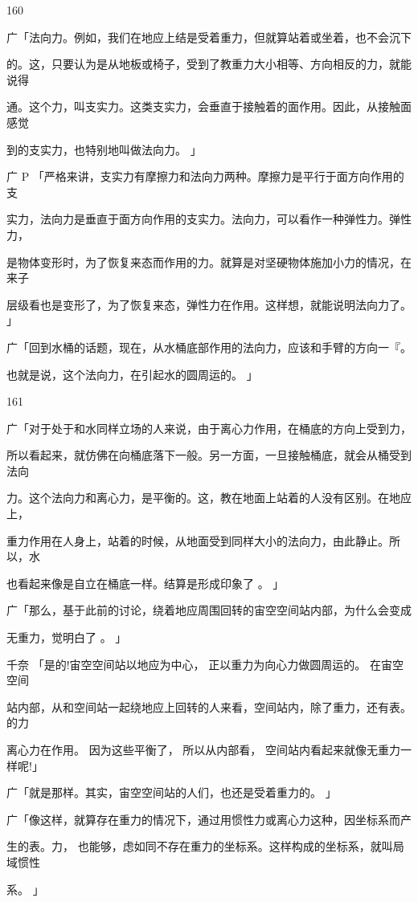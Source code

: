 160\par
广「法向力。例如，我们在地应上结是受着重力，但就算站着或坐着，也不会沉下\par
的。这，只要认为是从地板或椅子，受到了教重力大小相等、方向相反的力，就能说得\par
通。这个力，叫支实力。这类支实力，会垂直于接触着的面作用。因此，从接触面感觉\par
到的支实力，也特别地叫做法向力。 」\par
广 P 「严格来讲，支实力有摩擦力和法向力两种。摩擦力是平行于面方向作用的支\par
实力，法向力是垂直于面方向作用的支实力。法向力，可以看作一种弹性力。弹性力，\par
是物体变形时，为了恢复来态而作用的力。就算是对坚硬物体施加小力的情况，在来子\par
层级看也是变形了，为了恢复来态，弹性力在作用。这样想，就能说明法向力了。 」\par
广「回到水桶的话题，现在，从水桶底部作用的法向力，应该和手臂的方向一『。\par
也就是说，这个法向力，在引起水的圆周运的。 」\par

161\par
广「对于处于和水同样立场的人来说，由于离心力作用，在桶底的方向上受到力，\par
所以看起来，就仿佛在向桶底落下一般。另一方面，一旦接触桶底，就会从桶受到法向\par
力。这个法向力和离心力，是平衡的。这，教在地面上站着的人没有区别。在地应上，\par
重力作用在人身上，站着的时候，从地面受到同样大小的法向力，由此静止。所以，水\par
也看起来像是自立在桶底一样。结算是形成印象了 。 」\par
广「那么，基于此前的讨论，绕着地应周围回转的宙空空间站内部，为什么会变成\par
无重力，觉明白了 。 」\par
千奈 「是的!宙空空间站以地应为中心， 正以重力为向心力做圆周运的。 在宙空空间\par
站内部，从和空间站一起绕地应上回转的人来看，空间站内，除了重力，还有表。的力\par
离心力在作用。 因为这些平衡了， 所以从内部看， 空间站内看起来就像无重力一样呢!」\par
广「就是那样。其实，宙空空间站的人们，也还是受着重力的。 」\par
广「像这样，就算存在重力的情况下，通过用惯性力或离心力这种，因坐标系而产\par
生的表。力， 也能够，虑如同不存在重力的坐标系。这样构成的坐标系，就叫局域惯性\par
系。 」\par

